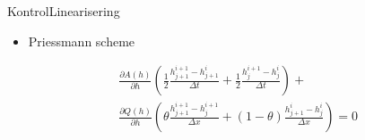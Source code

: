 \begin{frame}{Kontrol}{Linearisering}
 \vfill\vfill\centering    
\begin{itemize}
	\item Priessmann scheme

\end{itemize}
\begin{equation}\label{eq:preissmann_skrevet_om}
\begin{aligned}
	&\frac{\partial A(h)}{\partial h} \left(\frac{1}{2}\frac{h_{j+1}^{i+1}-h_{j+1}^i}{\Delta t} +  \frac{1}{2} \frac{h_{j}^{i+1} - h_j^i}{\Delta t}\right) + \\ &\frac{\partial Q(h)}{\partial h}\left(\theta \frac{h_{j+1}^{i+1}-h_j^{i+1}}{\Delta x}+(1-\theta)\frac{h_{j+1}^i - h_j^i}{\Delta x}\right)=0
\end{aligned}
\end{equation}
\vfill\vfill
\end{frame}




